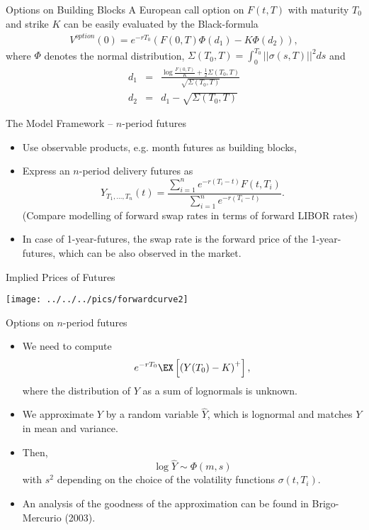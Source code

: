 {Options on Building Blocks}
A European call option on $F(t,T)$ with maturity $T_0$ and strike
$K$ can be easily evaluated by the Black-formula
\begin{eqnarray}\label{eq:month-option}
V^{option}(0)=e^{-rT_0}\left(F(0,T)\Phi(d_1)-K\Phi (d_2)\right),
\end{eqnarray}
where $\Phi$ denotes the normal distribution, $\Sigma(T_0,T)=\int_0^{T_0}||\sigma(s,T)||^2ds$ and
\begin{eqnarray*}
d_1& = & \frac{\log \frac{F(0,T)}{K}+\frac{1}{2}\Sigma(T_0,T)}{\sqrt{\Sigma(T_0,T)}}\\
d_2 & = & d_1 - \sqrt{\Sigma(T_0,T)}
\end{eqnarray*}




{The Model Framework -- $n$-period futures}
\begin{itemize}
\item<1-> Use observable products, e.g. month futures as building blocks,
\item<2-> Express an $n$-period delivery futures as
$$Y_{T_1, \ldots, T_n}(t)=\frac{\sum_{i=1}^n e^{-r(T_i-t)}F(t,T_i)}{\sum_{i=1}^n e^{-r(T_i-t)}}.$$
(Compare modelling of forward swap rates in terms of forward LIBOR rates)
\item<3-> In case of 1-year-futures, the swap rate is the forward price of the 1-year-futures,
which can be also observed in the market.
\end{itemize}



{Implied Prices of Futures}
\begin{center}
\texttt{[image: ../../../pics/forwardcurve2]}
\end{center}





{Options on $n$-period futures}
\begin{itemize}
\item<1-> We need to compute
$$e^{-rT_0} \EX \left[\left(Y(T_0)-K\right)^+\right],$$
where the distribution of $Y$ as a sum of lognormals is unknown.
\item<2->
We approximate $Y$ by a random variable $\hat{Y}$,
which is lognormal and matches $Y$ in mean and variance.
\item<3->
Then,
$$\log \hat{Y} \sim \Phi(m,s)$$
with $s^2$ depending on the choice of the volatility functions
$\sigma(t,T_i)$.
\item<4->
An analysis of the goodness of the approximation
can be found in Brigo-Mercurio (2003).
\end{itemize}




